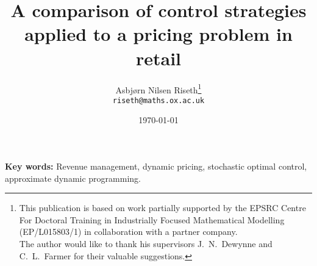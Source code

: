 \documentclass[a4paper,12pt]{article}
\title{A comparison of control strategies applied to a
  pricing problem in retail}
\author{Asbj{\o}rn Nilsen Riseth\thanks{
    This publication is based on work partially supported by the EPSRC
    Centre For Doctoral Training in Industrially Focused Mathematical
    Modelling (EP/L015803/1) in collaboration with a partner
    company.\\
    The author would like to thank his supervisors
    J.~N.~Dewynne and C.~L.~Farmer for their valuable suggestions.}\\
  {\footnotesize\texttt{riseth@maths.ox.ac.uk}}}
\affil{Mathematical Institute, University
  of Oxford, OX2 6GG.}
\date{\today}
\def\biblio{}
\begin{document}
\maketitle
\listoftodos

\def\biblio{}
\def\listoftodos{}



\vspace{1em}\noindent
\textbf{Key words:} Revenue management, dynamic pricing, stochastic
optimal control,
approximate dynamic programming.









\clearpage




%
\end{document}
